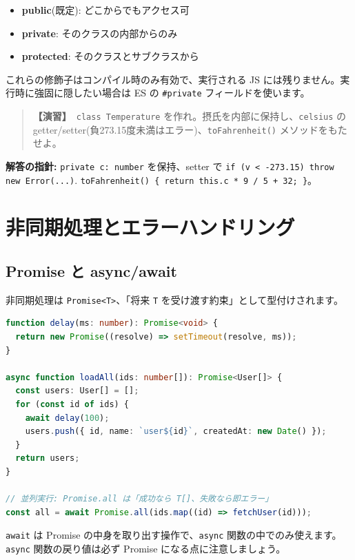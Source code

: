\documentclass{article}
\begin{document}
\begin{itemize}
\item \textbf{public}(既定): どこからでもアクセス可
\item \textbf{private}: そのクラスの内部からのみ
\item \textbf{protected}: そのクラスとサブクラスから
\end{itemize}

これらの修飾子はコンパイル時のみ有効で、実行される JS には残りません。実行時に強固に隠したい場合は ES の \texttt{\#private} フィールドを使います。

\begin{quote}
\textbf{【演習】}\ \texttt{class Temperature} を作れ。摂氏を内部に保持し、\texttt{celsius} の getter/setter(負273.15度未満はエラー)、\texttt{toFahrenheit()} メソッドをもたせよ。
\end{quote}

\textbf{解答の指針:} \texttt{private c: number} を保持、setter で \texttt{if (v < -273.15) throw new Error(...)}. \texttt{toFahrenheit() \{ return this.c * 9 / 5 + 32; \}}。

\section{非同期処理とエラーハンドリング}

\subsection{Promise と async/await}

非同期処理は \texttt{Promise<T>}、「将来 \texttt{T} を受け渡す約束」として型付けされます。

\begin{lstlisting}[language=TypeScript]
function delay(ms: number): Promise<void> {
  return new Promise((resolve) => setTimeout(resolve, ms));
}

async function loadAll(ids: number[]): Promise<User[]> {
  const users: User[] = [];
  for (const id of ids) {
    await delay(100);
    users.push({ id, name: `user${id}`, createdAt: new Date() });
  }
  return users;
}

// 並列実行: Promise.all は「成功なら T[]、失敗なら即エラー」
const all = await Promise.all(ids.map((id) => fetchUser(id)));
\end{lstlisting}

\texttt{await} は Promise の中身を取り出す操作で、\texttt{async} 関数の中でのみ使えます。\texttt{async} 関数の戻り値は必ず Promise になる点に注意しましょう。
\end{document}
